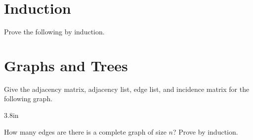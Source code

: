 \documentclass[solutionorbox, answers]{exam}
\begin{document}
\begin{questions}

\section*{Induction}
\label{sec:induction}

\question
Prove the following by induction.


\section*{Graphs and Trees}
\label{sec:graphs-trees}

\question 
Give the adjacency matrix, adjacency list, edge list, and incidence matrix for the following graph. \\
\begin{minipage}{0.3\linewidth}
\end{minipage}
\qquad
\begin{minipage}{0.6\linewidth}
\begin{solutionbox}{3.8in}                                                                          \\
\end{solutionbox}
\end{minipage}
\question
How many edges are there is a complete graph of size $n$? Prove by induction.


\end{questions}
\end{document}
